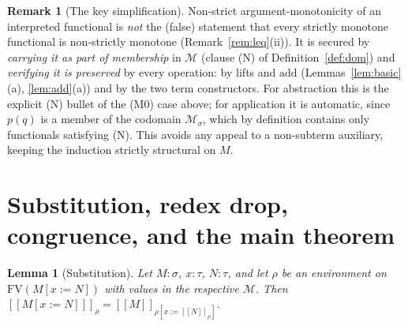 \documentclass{amsart}
\newtheorem{lemma}{Lemma}
\theoremstyle{definition}
\newtheorem{remark}{Remark}
\newcommand{\interp}[1]{[\![#1]\!]}
\newcommand{\FV}{\mathrm{FV}}
\begin{document}
\begin{remark}[The key simplification]\label{rem:keyfix}
Non-strict argument-monotonicity of an interpreted functional is \emph{not} the (false)
statement that every strictly monotone functional is non-strictly monotone
(Remark~\ref{rem:leq}(ii)). It is secured by \emph{carrying it as part of membership} in
$\mathcal M$ (clause (N) of Definition~\ref{def:dom}) and \emph{verifying it is preserved}
by every operation: by lifts and $\mathrm{add}$ (Lemmas~\ref{lem:basic}(a),
\ref{lem:add}(a)) and by the two term constructors. For abstraction this is the explicit
(N) bullet of the (M0) case above; for application it is automatic, since $p(q)$ is a member
of the codomain $\mathcal M_\sigma$, which by definition contains only functionals satisfying
(N). This avoids any appeal to a non-subterm auxiliary, keeping the induction strictly
structural on $M$.
\end{remark}

\section{Substitution, redex drop, congruence, and the main theorem}

\begin{lemma}[Substitution]\label{lem:subst}
Let $M:\sigma$, $x:\tau$, $N:\tau$, and let $\rho$ be an environment on $\FV(M[x:=N])$ with
values in the respective $\mathcal M$. Then
$\interp{M[x:=N]}_\rho=\interp{M}_{\rho[x:=\interp{N}_\rho]}$.
\end{lemma}
\end{document}
